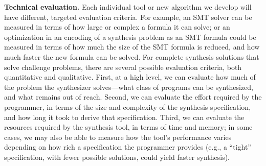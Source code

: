 \textbf{Technical evaluation.} Each individual tool or new algorithm we develop will have different, targeted evaluation criteria. For example, an SMT solver can be measured in terms of how large or complex a formula it can solve; or an optimization in an encoding of a synthesis problem as an SMT formula could be measured in terms of how much the size of the SMT formula is reduced, and how much faster the new formula can be solved. For complete synthesis solutions that solve challenge problems, there are several possible evaluation criteria, both quantitative and qualitative. First, at a high level, we can evaluate how much of the problem the synthesizer solves—what class of programs can be synthesized, and what remains out of reach. Second, we can evaluate the effort required by the programmer, in terms of the size and complexity of the synthesis specification, and how long it took to derive that specification. Third, we can evaluate the resources required by the synthesis tool, in terms of time and memory; in some cases, we may also be able to measure how the tool’s performance varies depending on how rich a specification the programmer provides (e.g., a “tight” specification, with fewer possible solutions, could yield faster synthesis).








